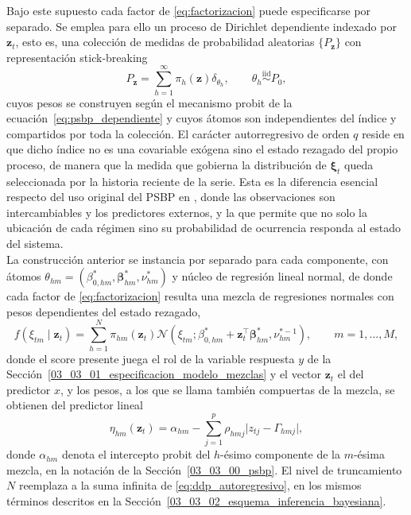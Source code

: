 Bajo este supuesto cada factor de \eqref{eq:factorizacion} puede especificarse por separado. Se emplea para ello un proceso de Dirichlet dependiente indexado por $\mathbf{z}_t$, esto es, una colección de medidas de probabilidad aleatorias $\{P_{\mathbf{z}}\}$ con representación stick-breaking
\begin{equation}\label{eq:ddp_autoregresivo}
    P_{\mathbf{z}} = \sum_{h=1}^{\infty} \pi_h(\mathbf{z})\delta_{\theta_h},
    \qquad \theta_h \overset{\mathrm{iid}}{\sim} P_0,
\end{equation}
cuyos pesos se construyen según el mecanismo probit de la ecuación~\eqref{eq:psbp_dependiente} y cuyos átomos son independientes del índice y compartidos por toda la colección. El carácter autorregresivo de orden $q$ reside en que dicho índice no es una covariable exógena sino el estado rezagado del propio proceso, de manera que la medida que gobierna la distribución de $\boldsymbol{\xi}_t$ queda seleccionada por la historia reciente de la serie. Esta es la diferencia esencial respecto del uso original del PSBP en \citet{03_02_chung2009nonparametric}, donde las observaciones son intercambiables y los predictores externos, y la que permite que no solo la ubicación de cada régimen sino su probabilidad de ocurrencia responda al estado del sistema.\\

La construcción anterior se instancia por separado para cada componente, con átomos $\theta_{hm} = (\beta_{0,hm}^*, \boldsymbol{\beta}_{hm}^*, \nu_{hm}^*)$ y núcleo de regresión lineal normal, de donde cada factor de \eqref{eq:factorizacion} resulta una mezcla de regresiones normales con pesos dependientes del estado rezagado,
\begin{equation}\label{eq:psbpm_fd_componente}
    f(\xi_{tm} \mid \mathbf{z}_{t}) = \sum_{h=1}^{N}
    \pi_{hm}(\mathbf{z}_{t})
    \mathcal{N}\!\left(\xi_{tm};
    \beta_{0,hm}^* + \mathbf{z}_{t}^\top \boldsymbol{\beta}_{hm}^*,
    \nu_{hm}^{*-1}\right),
    \qquad m = 1, \dots, M,
\end{equation}
donde el score presente juega el rol de la variable respuesta $y$ de la Sección~\ref{03_03_01_especificacion_modelo_mezclas} y el vector $\mathbf{z}_t$ el del predictor $x$, y los pesos, a los que se llama también compuertas de la mezcla, se obtienen del predictor lineal
\begin{equation}\label{eq:eta_psbpm_fd}
    \eta_{hm}(\mathbf{z}_t) = \alpha_{hm}
    - \sum_{j=1}^{p} \rho_{hmj}\bigl|z_{tj} - \Gamma_{hmj}\bigr|,
\end{equation}
donde $\alpha_{hm}$ denota el intercepto probit del $h$-ésimo componente de la $m$-ésima mezcla, en la notación de la Sección~\ref{03_03_00_psbp}. El nivel de truncamiento $N$ reemplaza a la suma infinita de \eqref{eq:ddp_autoregresivo}, en los mismos términos descritos en la Sección~\ref{03_03_02_esquema_inferencia_bayesiana}.\\

